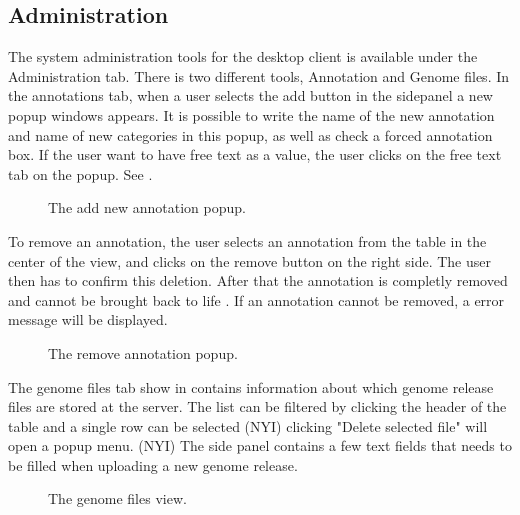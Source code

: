 \subsection{Administration}
The system administration tools for the desktop client is available under the Administration tab. There is two different tools, Annotation and Genome files. In the annotations tab, when a user selects the add button in the sidepanel a new popup windows appears. It is possible to write the name of the new annotation and name of new categories in this popup, as well as check a forced annotation box. If the user want to have free text as a value, the user clicks on the free text tab on the popup. See .
\begin{figure}[h!]
\caption{The add new annotation popup.}
\label{fig:adm_desktopgui}
\end{figure}
To remove an annotation, the user selects an annotation from the table in the center of the view, and clicks on the remove button on the right side. The user then has to confirm this deletion. After that the annotation is completly removed and cannot be brought back to life . If an annotation cannot be removed, a error message will be displayed.
\begin{figure}[h!]
\caption{The remove annotation popup.}
\label{fig:adm_desktopRemoveAnnotation}
\end{figure}

The genome files tab show in  contains information about which genome release files are stored at the server. The list can be filtered by clicking the header of the table and a single row can be selected (NYI) clicking "Delete selected file" will open a popup menu. (NYI) The side panel contains a few text fields that needs to be filled when uploading a new genome release.

\begin{figure}[h!]
\caption{The genome files view.}
\label{fig:adm_desktopGenomeTab}
\end{figure}
